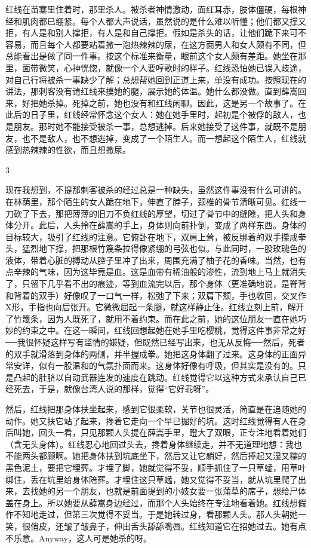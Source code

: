 红线在苗寨里住着时，那里杀人。被杀者神情激动，面红耳赤，肢体僵硬，每根神经和肌肉都已绷紧。每个人都大声说话，虽然说的是什么难以听懂；他们都又撑又拒，有人是和别人撑拒，有人是和自己撑拒。假如是杀头的话，让他们跪下来可不容易，而且每个人都要站着撒一泡热辣辣的尿，在这方面男人和女人颇有不同，但总能看出是做了同一件事。按这个标准来衡量，眼前这个女人颇有差距。她坐在那里，面带微笑，心神恍惚，就像一个人要哼歌时的样子。红线恐怕她已误入歧途，对自己行将被杀一事缺少了解；总想帮她回到正道上来，单没有成功。按照现在的讲法，那刺客没有请红线来摸她的腿，展示她的体温。她什么都没做。直到薛嵩回来，好把她杀掉。死掉之前，她也没有和红线闲聊。因此，这是另一个故事了。在此后的日子里，红线经常怀念这个女人：她在她手里时，起初是个被俘的敌人，也是朋友。那时她不能接受被杀一事，总想逃掉。后来她接受了这件事，就既不是朋友，也不是敌人，也不想逃掉，变成了一个陌生人。而一想起这个陌生人，红线就感到热辣辣的性欲，而且想撒尿。 

3 

现在我想到，不提那刺客被杀的经过总是一种缺失，虽然这件事没有什么可讲的。在林荫里，那个陌生的女人跪在地下，伸直了脖子，颈椎的骨节清晰可见。红线一刀砍了下去，那把薄薄的旧刀不负红线的厚望，切过了骨节中的缝隙，把人头和身体分开。此后，人头拎在薛嵩的手上，身体则向前扑倒，变成了两样东西。身体的目标较大，吸引了红线的注意。它俯卧在地下，双肩上耸，被反绑着的双手攥成拳头，猛烈地下撑，把那根竹篾条拉得像紧绷的弓弦也似。与此同时，一股玫瑰色的液体，带着心脏的搏动从腔子里冲了出来，周围充满了柚子花的香味。当然，也有点辛辣的气味，因为这毕竟是血。这是血带有稀油般的渗性，流到地上马上就消失了，只留下几乎看不出的痕迹，等到血流完以后，那个身体（更准确地说，是脊背和背着的双手）好像叹了一口气一样，松弛了下来；双肩下颓，手也收回，交叉作X形，手指也向后张开。它微微屈起一条腿，就这样静止住。红线立刻上前，解开了竹篾条，因为人既死了，就用不着约束。而在此之前，她的这位朋友一直在她巧妙的约束之中。在这一瞬间，红线回想起她在她手里吃樱桃，觉得这件事非常之好──我很怀疑这样写有滥情的嫌疑，但既然已经写出来，也无从反悔──然后，死者的双手就滑落到身体的两侧，并半握成拳。她把这身体翻了过来。这身体的正面异常安详，似有一股温和的气氛扑面而来。这身体好像有呼吸，但其实是没有的。只是凸起的肚脐以自动武器连发的速度在跳动。红线觉得它以这种方式来承认自己已经死去，于是，就像台湾人说的那样，觉得“它好乖呀”。 

然后，红线把那身体扶坐起来，感到它很柔软，关节也很灵活，简直是在追随她的动作。她又扶它站了起来，搀着它走向一个早已掘好的坑。这时红线觉得有人在身后叫她，回头一看，只见那颗人头提在薛嵩手里，瞪大了双眼，正专注地看着她们（含无头身体）。红线忍心地回过头去，搀着身体继续走，并不无道理地想：我也不能两头都顾啊。她把身体扶到坑底坐下，然后又让它躺好，然后捧起又湿又糯的黑色泥土，要把它埋葬。才埋了脚，她就觉得不妥，顺手抓住了一只草蜢，用草叶绑住，丢在坑里给身体陪葬。才埋住这只草蜢，她又觉得不妥当，就从坑里爬了出来，去找她的另一个朋友，也就是前面提到的小妓女要一张蒲草的席子，想给尸体盖在身上。所以她要从薛嵩身边经过，而那个人头始终在专注地看着她。红线想假作不知地走过，但第三次觉得不妥当。于是她转过身，看那颗人头。那人头朝她一笑，很俏皮，还皱了皱鼻子，伸出舌头舔舔嘴唇。红线知道它在招她过去。她有点不乐意。Anyway，这人可是她杀的呀。 

